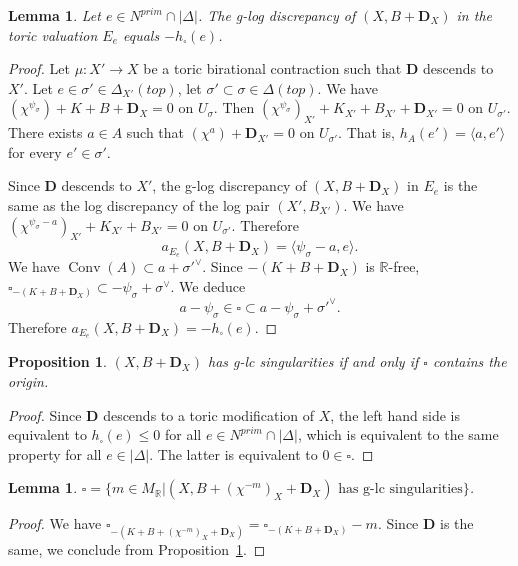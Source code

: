 \documentclass[12pt,twoside]{amsart}
\newcommand{\R}{{\mathbb R}}
\newcommand{\bD}{{\mathbf D}}
\newcommand{\Conv}{\operatorname{Conv}}
\theoremstyle{plain}
\newtheorem{lem}[thm]{Lemma}
\newtheorem{prop}[thm]{Proposition}
\theoremstyle{definition}
\theoremstyle{remark}
\begin{document}
\begin{lem}
	Let $e\in N^{prim}\cap |\Delta|$. The g-log discrepancy of $(X,B+\bD_X)$
	in the toric valuation $E_e$ equals $-h_\square(e)$.
\end{lem}

\begin{proof}
Let $\mu\colon X'\to X$ be a toric birational contraction such that $\bD$ descends to
$X'$. Let $e\in \sigma'\in \Delta_{X'}(top)$, let $\sigma'\subset \sigma\in \Delta(top)$.	
We have $(\chi^{\psi_\sigma})+K+B+\bD_X=0$ on $U_\sigma$.
Then $(\chi^{\psi_\sigma})_{X'}+K_{X'}+B_{X'}+\bD_{X'}=0$ on $U_{\sigma'}$.
There exists $a\in A$ such that $(\chi^a)+\bD_{X'}=0$ on $U_{\sigma'}$.
That is, $h_A(e')=\langle a,e'\rangle$ for every $e' \in \sigma'$.

Since $\bD$ descends to $X'$, the g-log discrepancy of $(X,B+\bD_X)$ in $E_e$
is the same as the log discrepancy of the log pair $(X',B_{X'})$.
We have $(\chi^{\psi_\sigma-a})_{X'}+K_{X'}+B_{X'}=0$ on $U_{\sigma'}$. Therefore
$$
a_{E_e}(X,B+\bD_X)=\langle \psi_\sigma-a,e\rangle.
$$
We have $\Conv(A)\subset a+\sigma'^\vee$. Since $-(K+B+\bD_X)$ is $\R$-free,
$\square_{-(K+B+\bD_X)}\subset -\psi_\sigma+\sigma^\vee$. We deduce
$$
a-\psi_\sigma\in \square\subset a-\psi_\sigma+{\sigma'}^\vee.
$$
Therefore 
$
a_{E_e}(X,B+\bD_X)=-h_\square(e).
$
\end{proof}

\begin{prop}\label{lccr}
	$(X,B+\bD_X)$ has g-lc singularities if and only if $\square$ contains the origin.
\end{prop}

\begin{proof}
	Since $\bD$ descends to a toric modification of $X$, the left hand side is 
	equivalent to $h_\square(e)\le 0$ for all $e\in N^{prim}\cap |\Delta|$,
	which is equivalent to the same property for all $e\in |\Delta|$. The latter
	is equivalent to $0\in \square$.
\end{proof}

\begin{lem}\label{sqc1}
	$\square=\{ m\in M_\R |  (X,B+(\chi^{-m})_X+\bD_X) \text{ has g-lc singularities}  \}$.
\end{lem}

\begin{proof}
	We have $\square_{-(K+B+(\chi^{-m})_X+\bD_X)}=\square_{-(K+B+\bD_X)}-m$.
	Since $\bD$ is the same, we conclude from Proposition~\ref{lccr}.
\end{proof}
\end{document}
